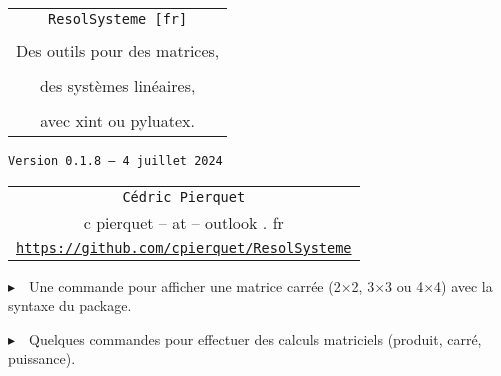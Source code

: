 \documentclass[french,a4paper,11pt]{article}
\def\TPversion{0.1.8}
\def\TPdate{4 juillet 2024}
\begin{document}
\setlength{\aweboxleftmargin}{0.07\linewidth}
\setlength{\aweboxcontentwidth}{0.93\linewidth}
\setlength{\aweboxvskip}{8pt}

\pagestyle{fancy}

\thispagestyle{empty}

\vspace{2cm}

\begin{center}
	\begin{minipage}{0.75\linewidth}
	\begin{tcolorbox}[colframe=yellow,colback=yellow!15]
		\begin{center}
			\begin{tabular}{c}
				{\Huge \texttt{ResolSysteme [fr]}}\\
				\\
				{\LARGE Des outils pour des matrices, } \\
				\\
				{\LARGE des systèmes linéaires,} \\
				\\
				{\LARGE avec xint ou pyluatex.} \\
			\end{tabular}
			
			\bigskip
			
			{\small \texttt{Version \TPversion{} -- \TPdate}}
		\end{center}
	\end{tcolorbox}
\end{minipage}
\end{center}

\begin{center}
	\begin{tabular}{c}
	\texttt{Cédric Pierquet}\\
	{\ttfamily c pierquet -- at -- outlook . fr}\\
	\texttt{\url{https://github.com/cpierquet/ResolSysteme}}
\end{tabular}
\end{center}

\vspace{0.25cm}

{$\blacktriangleright$~~Une commande pour afficher une matrice carrée (2×2, 3×3 ou 4×4) avec la syntaxe du package.}

\smallskip

{$\blacktriangleright$~~Quelques commandes pour effectuer des calculs matriciels (produit, carré, puissance).}

\smallskip
\end{document}
